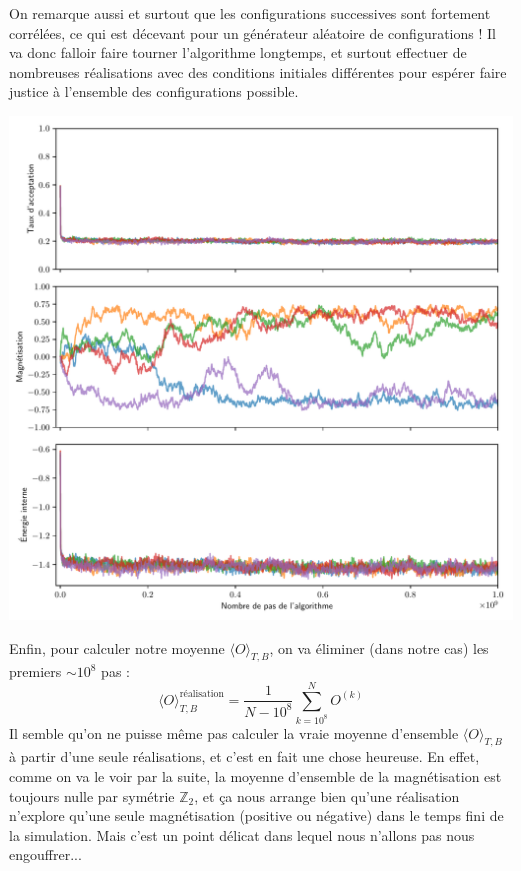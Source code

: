 \documentclass{book}
\begin{document}
\begin{correction}
On remarque aussi et surtout que les configurations successives sont fortement corrélées, ce qui est décevant pour un générateur aléatoire de configurations ! Il va donc falloir faire tourner l'algorithme longtemps, et surtout effectuer de nombreuses réalisations avec des conditions initiales différentes pour espérer faire justice à l'ensemble des configurations possible.\\
\begin{center}
\includegraphics[width=1\linewidth]{TD3/ising_stats_courbes_T1_B0_nx200_ny100.pdf}
\end{center}
Enfin, pour calculer notre moyenne $\langle O \rangle_{T,B}$, on va éliminer (dans notre cas) les premiers $\sim 10^8$ pas :
\begin{equation*}
\langle O \rangle_{T,B}^\text{réalisation} = \frac{1}{N-10^8} \sum_{k=10^8}^{N} O^{(k)}
\end{equation*}
Il semble qu'on ne puisse même pas calculer la vraie moyenne d'ensemble $\langle O \rangle_{T,B}$ à partir d'une seule réalisations, et c'est en fait une chose heureuse. En effet, comme on va le voir par la suite, la moyenne d'ensemble de la magnétisation est toujours nulle par symétrie $\mathbb{Z}_2$, et ça nous arrange bien qu'une réalisation n'explore qu'une seule magnétisation (positive ou négative) dans le temps fini de la simulation. Mais c'est un point délicat dans lequel nous n'allons pas nous engouffrer...
\end{correction}
\end{document}
